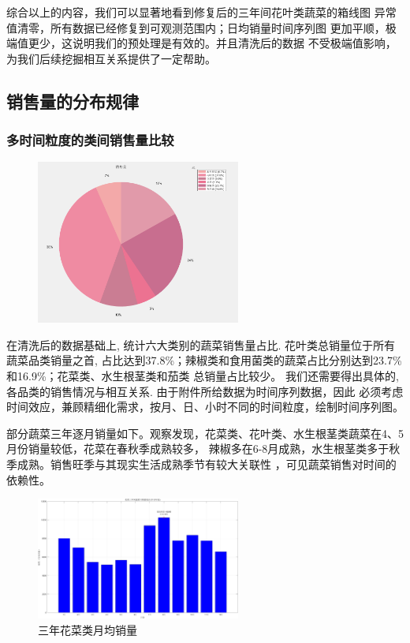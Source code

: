 \documentclass{cumcmthesis}
\begin{document}
综合以上的内容，我们可以显著地看到修复后的三年间花叶类蔬菜的箱线图
异常值清零，所有数据已经修复到可观测范围内；日均销量时间序列图
更加平顺，极端值更少，这说明我们的预处理是有效的。并且清洗后的数据
不受极端值影响，为我们后续挖掘相互关系提供了一定帮助。

\subsection  {销售量的分布规律}

\subsubsection{多时间粒度的类间销售量比较}
\begin{figure}[H]
    \centering
    \includegraphics[width=0.6\textwidth]{销售量占比.png}
\end{figure}

在清洗后的数据基础上, 统计六大类别的蔬菜销售量占比. 花叶类总销量位于所有蔬菜品类销量之首, 
占比达到37.8\%；辣椒类和食用菌类的蔬菜占比分别达到23.7\%和16.9\%；花菜类、水生根茎类和茄类
总销量占比较少。
我们还需要得出具体的, 各品类的销售情况与相互关系. 由于附件所给数据为时间序列数据，因此
必须考虑时间效应，兼顾精细化需求，按月、日、小时不同的时间粒度，绘制时间序列图。


部分蔬菜三年逐月销量如下。观察发现，花菜类、花叶类、水生根茎类蔬菜在4、5月份销量较低，花菜在春秋季成熟较多，
辣椒多在6-8月成熟，水生根茎类多于秋季成熟。销售旺季与其现实生活成熟季节有较大关联性
，可见蔬菜销售对时间的依赖性。
\begin{figure}[H]
    \centering
    \includegraphics[width=0.6\textwidth]{三年花菜类月均销量.png} 
    \caption{三年花菜类月均销量}
\end{figure}
\end{document}

